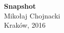 \begin{titlepage}
  \begin{center}
    \vspace{5.0cm}
    {\Huge \bf Snapshot}\\
    \vspace{3.0cm}
    {\large Mikołaj Chojnacki}\\
    \vspace{2.0cm}
    {Kraków, 2016}
  \end{center}
\end{titlepage}
\pagebreak
\cleardoublepage
